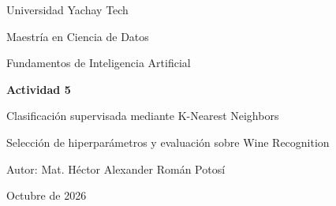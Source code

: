 ﻿\documentclass[11pt,a4paper]{article}
\begin{document}
\begin{titlepage}
\centering
\vspace*{2cm}

{\Large Universidad Yachay Tech\par}
\vspace{0.5cm}
{\large Maestría en Ciencia de Datos\par}
{\large Fundamentos de Inteligencia Artificial\par}

\vspace{2.5cm}

{\Huge\bfseries Actividad 5\par}
\vspace{0.5cm}

{\LARGE Clasificación supervisada mediante
K-Nearest Neighbors\par}

\vspace{0.8cm}
{\large Selección de hiperparámetros y
evaluación sobre Wine Recognition\par}

\vfill

{\large Autor: Mat. Héctor Alexander Román Potosí\par}

\vspace{1cm}

{\large Octubre de 2026\par}

\end{titlepage}

\begin{abstract}
Se implementó un clasificador de aprendizaje
supervisado basado en K-Nearest Neighbors (KNN)
para identificar tres clases de vinos mediante
trece características químicas.

Se emplearon 178 observaciones del conjunto Wine
Recognition, una división estratificada del 80\%
para entrenamiento y 20\% para prueba, y validación
cruzada estratificada de cinco particiones.

La búsqueda de hiperparámetros evaluó valores
de $K$ entre 1 y 60. El mejor valor observado
fue $K=29$, con una exactitud media de validación
de 97.88\%.

En la evaluación final se obtuvo una exactitud
de 97.22\%, correspondiente a 35 predicciones
correctas de 36.

\textbf{Palabras clave:} aprendizaje supervisado,
KNN, clasificación multiclase, validación cruzada,
selección de hiperparámetros.
\end{abstract}
\end{document}
